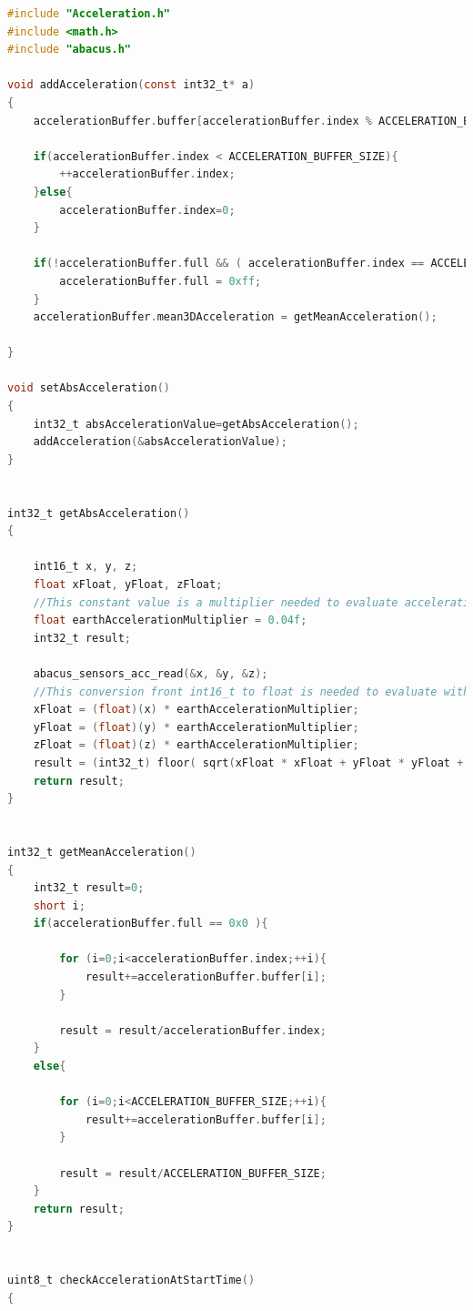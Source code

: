 \documentclass[LaM,binding=0.6cm]{../sapthesis}
\begin{document}
\begin{small}
\begin{lstlisting}[language=C]
#include "Acceleration.h"
#include <math.h>
#include "abacus.h"

void addAcceleration(const int32_t* a)
{
    accelerationBuffer.buffer[accelerationBuffer.index % ACCELERATION_BUFFER_SIZE] = *a;

    if(accelerationBuffer.index < ACCELERATION_BUFFER_SIZE){
        ++accelerationBuffer.index;
    }else{
        accelerationBuffer.index=0;
    }

    if(!accelerationBuffer.full && ( accelerationBuffer.index == ACCELERATION_BUFFER_SIZE ) ){
        accelerationBuffer.full = 0xff;
    }
    accelerationBuffer.mean3DAcceleration = getMeanAcceleration();

}

void setAbsAcceleration()
{
    int32_t absAccelerationValue=getAbsAcceleration();
    addAcceleration(&absAccelerationValue);
}


int32_t getAbsAcceleration()
{

    int16_t x, y, z;
    float xFloat, yFloat, zFloat;   
    //This constant value is a multiplier needed to evaluate acceleration on earth
    float earthAccelerationMultiplier = 0.04f;
    int32_t result;

    abacus_sensors_acc_read(&x, &y, &z);
    //This conversion front int16_t to float is needed to evaluate with more precision the absolute value of acceleration
    xFloat = (float)(x) * earthAccelerationMultiplier;
    yFloat = (float)(y) * earthAccelerationMultiplier;
    zFloat = (float)(z) * earthAccelerationMultiplier;
    result = (int32_t) floor( sqrt(xFloat * xFloat + yFloat * yFloat + zFloat * zFloat ) ) ;
    return result;
}


int32_t getMeanAcceleration()
{
    int32_t result=0;
    short i;
    if(accelerationBuffer.full == 0x0 ){

        for (i=0;i<accelerationBuffer.index;++i){
            result+=accelerationBuffer.buffer[i];
        }

        result = result/accelerationBuffer.index;
    }
    else{

        for (i=0;i<ACCELERATION_BUFFER_SIZE;++i){
            result+=accelerationBuffer.buffer[i];
        }

        result = result/ACCELERATION_BUFFER_SIZE;
    }
    return result;
}


uint8_t checkAccelerationAtStartTime()
{


\end{lstlisting}
\end{small}
\end{document}
